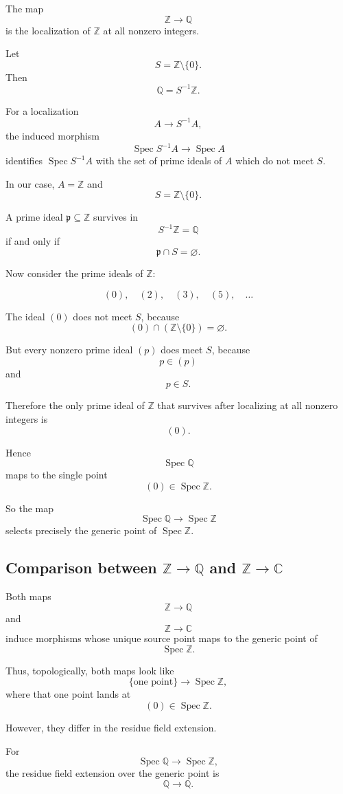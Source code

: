 \documentclass[12pt,a4paper]{article}
\DeclareMathOperator{\Spec}{Spec}
\theoremstyle{notespace}
\begin{document}
The map
\[
\mathbb Z\to \mathbb Q
\]
is the localization of \(\mathbb Z\) at all nonzero integers.

Let
\[
S=\mathbb Z\setminus\{0\}.
\]
Then
\[
\mathbb Q=S^{-1}\mathbb Z.
\]

For a localization
\[
A\to S^{-1}A,
\]
the induced morphism
\[
\Spec S^{-1}A\to \Spec A
\]
identifies \(\Spec S^{-1}A\) with the set of prime ideals of \(A\) which do not meet \(S\).

In our case, \(A=\mathbb Z\) and
\[
S=\mathbb Z\setminus\{0\}.
\]

A prime ideal \(\mathfrak p\subseteq \mathbb Z\) survives in
\[
S^{-1}\mathbb Z=\mathbb Q
\]
if and only if
\[
\mathfrak p\cap S=\varnothing.
\]

Now consider the prime ideals of \(\mathbb Z\):

\[
(0),\quad (2),\quad (3),\quad (5),\quad \dots
\]

The ideal \((0)\) does not meet \(S\), because
\[
(0)\cap(\mathbb Z\setminus\{0\})=\varnothing.
\]

But every nonzero prime ideal \((p)\) does meet \(S\), because
\[
p\in (p)
\]
and
\[
p\in S.
\]

Therefore the only prime ideal of \(\mathbb Z\) that survives after localizing at all nonzero integers is
\[
(0).
\]

Hence
\[
\Spec\mathbb Q
\]
maps to the single point
\[
(0)\in \Spec\mathbb Z.
\]

So the map
\[
\Spec\mathbb Q\to \Spec\mathbb Z
\]
selects precisely the generic point of \(\Spec\mathbb Z\).

\subsection{Comparison between \texorpdfstring{\(\mathbb Z\to \mathbb Q\)}{Z to Q}
	and \texorpdfstring{\(\mathbb Z\to \mathbb C\)}{Z to C}}

Both maps
\[
\mathbb Z\to \mathbb Q
\]
and
\[
\mathbb Z\to \mathbb C
\]
induce morphisms whose unique source point maps to the generic point of
\[
\Spec\mathbb Z.
\]

Thus, topologically, both maps look like
\[
\{\text{one point}\}\longrightarrow \Spec\mathbb Z,
\]
where that one point lands at
\[
(0)\in \Spec\mathbb Z.
\]

However, they differ in the residue field extension.

For
\[
\Spec\mathbb Q\to \Spec\mathbb Z,
\]
the residue field extension over the generic point is
\[
\mathbb Q\to \mathbb Q.
\]
\end{document}
